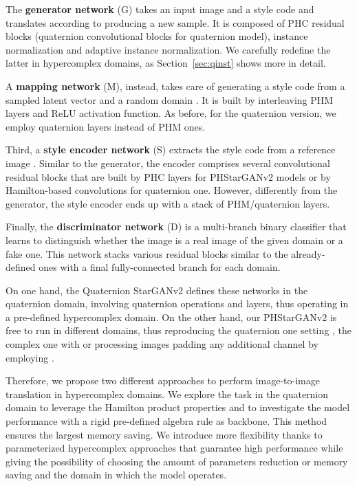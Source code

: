 \documentclass[conference]{IEEEtran}
\begin{document}
The \textbf{generator network} (G) takes an input image  and a style code  and translates  according to  producing a new sample. It is composed of PHC residual blocks (quaternion convolutional blocks for quaternion model), instance normalization and adaptive instance normalization. We carefully redefine the latter in hypercomplex domains, as Section~\ref{sec:qinst} shows more in detail.

\noindent A \textbf{mapping network} (M), instead, takes care of generating a style code  from a sampled latent vector  and a random domain . It is built by interleaving PHM layers and ReLU activation function. As before, for the quaternion version, we employ quaternion layers instead of PHM ones.

\noindent Third, a \textbf{style encoder network} (S) extracts the style code  from a reference image . Similar to the generator, the encoder comprises several convolutional residual blocks that are built by PHC layers for PHStarGANv2 models or by Hamilton-based convolutions for quaternion one. However, differently from the generator, the style encoder ends up with a stack of PHM/quaternion layers.

\noindent Finally, the \textbf{discriminator network} (D) is a multi-branch binary classifier that learns to distinguish whether the image  is a real image of the given domain  or a fake one. This network stacks various residual blocks similar to the already-defined ones with a final fully-connected branch for each domain.

On one hand, the Quaternion StarGANv2 defines these networks in the quaternion domain, involving quaternion operations and layers, thus operating in a pre-defined hypercomplex domain. On the other hand, our PHStarGANv2 is free to run in different domains, thus reproducing the quaternion one setting , the complex one with  or processing images padding any additional channel by employing .

Therefore, we propose two different approaches to perform image-to-image translation in hypercomplex domains. We explore the task in the quaternion domain to leverage the Hamilton product properties and to investigate the model performance with a rigid pre-defined algebra rule as backbone. This method ensures the largest memory saving. We introduce more flexibility thanks to parameterized hypercomplex approaches that guarantee high performance while giving the possibility of choosing the amount of parameters reduction or memory saving and the domain in which the model operates.
\end{document}
